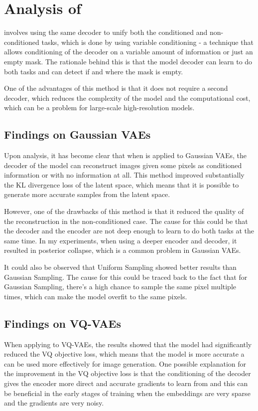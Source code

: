 \section{Analysis of }

 involves using the same decoder to unify both the conditioned and non-conditioned tasks, which is done by using variable conditioning - a technique that allows conditioning of the decoder on a variable amount of information or just an empty mask. The rationale behind this is that the model decoder can learn to do both tasks and can detect if and where the mask is empty.

One of the advantages of this method is that it does not require a second decoder, which reduces the complexity of the model and the computational cost, which can be a problem for large-scale high-resolution models.

\subsection{Findings on Gaussian VAEs}

Upon analysis, it has become clear that when  is applied to Gaussian VAEs, the decoder of the model can reconstruct images given some pixels as conditioned information or with no information at all. This method improved substantially the KL divergence loss of the latent space, which means that it is possible to generate more accurate samples from the latent space. 

However, one of the drawbacks of this method is that it reduced the quality of the reconstruction in the non-conditioned case. The cause for this could be that the decoder and the encoder are not deep enough to learn to do both tasks at the same time. In my experiments, when using a deeper encoder and decoder, it resulted in posterior collapse, which is a common problem in Gaussian VAEs.

It could also be observed that Uniform Sampling showed better results than Gaussian Sampling. The cause for this could be traced back to the fact that for Gaussian Sampling, there's a high chance to sample the same pixel multiple times, which can make the model overfit to the same pixels.


\subsection{Findings on VQ-VAEs}

When applying  to VQ-VAEs, the results showed that the model had significantly reduced the VQ objective loss, which means that the model is more accurate a can be used more effectively for image generation. One possible explanation for the improvement in the VQ objective loss is that the conditioning of the decoder gives the encoder more direct and accurate gradients to learn from and this can be beneficial in the early stages of training when the embeddings are very sparse and the gradients are very noisy.


